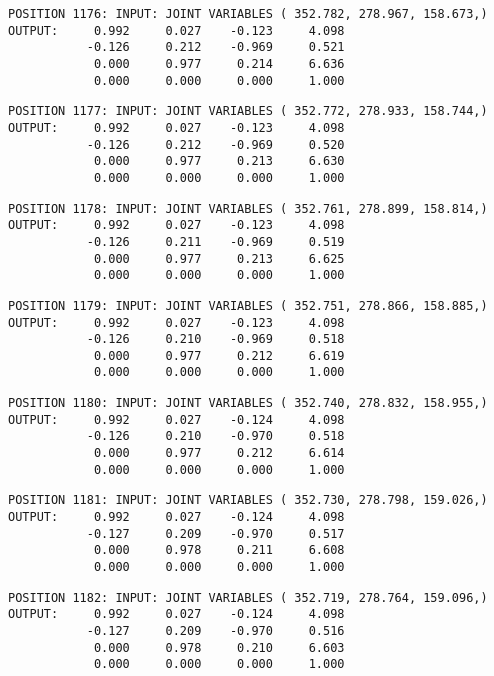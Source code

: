 \begin{verbatim}
POSITION 1176: INPUT: JOINT VARIABLES ( 352.782, 278.967, 158.673,)
OUTPUT:     0.992     0.027    -0.123     4.098
           -0.126     0.212    -0.969     0.521
            0.000     0.977     0.214     6.636
            0.000     0.000     0.000     1.000
\end{verbatim} \pagebreak[1]\begin{verbatim}
POSITION 1177: INPUT: JOINT VARIABLES ( 352.772, 278.933, 158.744,)
OUTPUT:     0.992     0.027    -0.123     4.098
           -0.126     0.212    -0.969     0.520
            0.000     0.977     0.213     6.630
            0.000     0.000     0.000     1.000
\end{verbatim} \pagebreak[1]\begin{verbatim}
POSITION 1178: INPUT: JOINT VARIABLES ( 352.761, 278.899, 158.814,)
OUTPUT:     0.992     0.027    -0.123     4.098
           -0.126     0.211    -0.969     0.519
            0.000     0.977     0.213     6.625
            0.000     0.000     0.000     1.000
\end{verbatim} \pagebreak[1]\begin{verbatim}
POSITION 1179: INPUT: JOINT VARIABLES ( 352.751, 278.866, 158.885,)
OUTPUT:     0.992     0.027    -0.123     4.098
           -0.126     0.210    -0.969     0.518
            0.000     0.977     0.212     6.619
            0.000     0.000     0.000     1.000
\end{verbatim} \pagebreak[1]\begin{verbatim}
POSITION 1180: INPUT: JOINT VARIABLES ( 352.740, 278.832, 158.955,)
OUTPUT:     0.992     0.027    -0.124     4.098
           -0.126     0.210    -0.970     0.518
            0.000     0.977     0.212     6.614
            0.000     0.000     0.000     1.000
\end{verbatim} \pagebreak[1]\begin{verbatim}
POSITION 1181: INPUT: JOINT VARIABLES ( 352.730, 278.798, 159.026,)
OUTPUT:     0.992     0.027    -0.124     4.098
           -0.127     0.209    -0.970     0.517
            0.000     0.978     0.211     6.608
            0.000     0.000     0.000     1.000
\end{verbatim} \pagebreak[1]\begin{verbatim}
POSITION 1182: INPUT: JOINT VARIABLES ( 352.719, 278.764, 159.096,)
OUTPUT:     0.992     0.027    -0.124     4.098
           -0.127     0.209    -0.970     0.516
            0.000     0.978     0.210     6.603
            0.000     0.000     0.000     1.000
\end{verbatim} \pagebreak[1]\begin{verbatim}

\end{verbatim}
